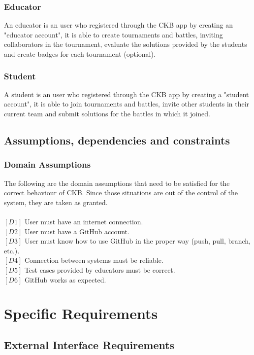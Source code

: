 \documentclass{article}
\begin{document}
\subsubsection{Educator}
An educator is an user who registered through the CKB app by creating an "educator account", it is able to create tournaments and battles, inviting collaborators in the tournament, evaluate the solutions provided by the students and create badges for each tournament (optional).
\subsubsection{Student}
A student is an user who registered through the CKB app by creating a "student account", it is able to join tournaments and battles, invite other students in their current team and submit solutions for the battles in which it joined.
\subsection{Assumptions, dependencies and constraints}

\subsubsection{Domain Assumptions}
The following are the domain assumptions that need to be satisfied for the correct behaviour of CKB. Since those situations are out of the control of the system, they are taken as granted.\\\\
$[D1]$ User must have an internet connection.\\
$[D2]$ User must have a GitHub account.\\
$[D3]$ User must know how to use GitHub in the proper way (push, pull, branch, etc.).\\
$[D4]$ Connection between systems must be reliable.\\
$[D5]$ Test cases provided by educators must be correct.\\
$[D6]$ GitHub works as expected.\\

\section{Specific Requirements}
\subsection{External Interface Requirements}
\end{document}
